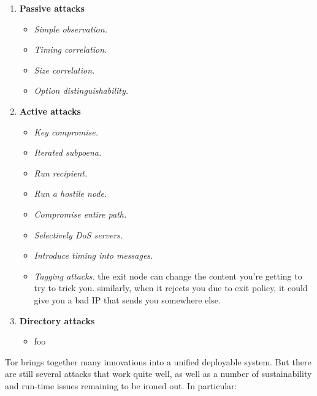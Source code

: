 \documentclass[times,10pt,twocolumn]{article}
\begin{document}
\begin{enumerate}
\item \textbf{Passive attacks}
\begin{itemize}
\item \emph{Simple observation.}
\item \emph{Timing correlation.}
\item \emph{Size correlation.}
\item \emph{Option distinguishability.}
\end{itemize}

\item \textbf{Active attacks}
\begin{itemize}
\item \emph{Key compromise.}
\item \emph{Iterated subpoena.}
\item \emph{Run recipient.}
\item \emph{Run a hostile node.}
\item \emph{Compromise entire path.}
\item \emph{Selectively DoS servers.}
\item \emph{Introduce timing into messages.}
\item \emph{Tagging attacks.}
the exit node can change the content you're getting to try to
trick you. similarly, when it rejects you due to exit policy,
it could give you a bad IP that sends you somewhere else.
\end{itemize}

\item \textbf{Directory attacks}
\begin{itemize}
\item foo
\end{itemize}

\end{enumerate}


\label{sec:conclusion}

Tor brings together many innovations into
a unified deployable system. But there are still several attacks that
work quite well, as well as a number of sustainability and run-time
issues remaining to be ironed out. In particular:
\end{document}
